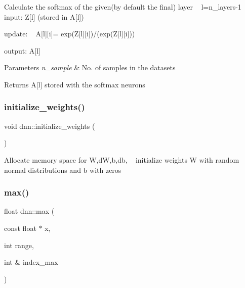 Calculate the softmax of the given(by default the final) layer ~\newline
 l=n\+\_\+layers-\/1 ~\newline
 input\+: Z\mbox{[}l\mbox{]} (stored in A\mbox{[}l\mbox{]}) ~\newline


update\+: ~\newline
 A\mbox{[}l\mbox{]}\mbox{[}i\mbox{]}= exp(\+Z\mbox{[}l\mbox{]}\mbox{[}i\mbox{]})/(exp(\+Z\mbox{[}l\mbox{]}\mbox{[}i\mbox{]})) ~\newline


output\+: A\mbox{[}l\mbox{]} ~\newline
 
\begin{DoxyParams}{Parameters}
{\em n\+\_\+sample} & No. of samples in the datasets \\
\hline
\end{DoxyParams}
\begin{DoxyReturn}{Returns}
A\mbox{[}l\mbox{]} stored with the softmax neurons 
\end{DoxyReturn}
\mbox{\label{classdnn_aea2749931a0cb4bd48112371852633a9}} 
\subsubsection{\texorpdfstring{initialize\+\_\+weights()}{initialize\_weights()}}
{\footnotesize\ttfamily void dnn\+::initialize\+\_\+weights (\begin{DoxyParamCaption}{ }\end{DoxyParamCaption})}

Allocate memory space for W,dW,b,db, ~\newline
 initialize weights W with random ~\newline
 normal distributions and b with zeros ~\newline
 \mbox{\label{classdnn_acb3008f68cd011e0820612c972fae41d}} 
\subsubsection{\texorpdfstring{max()}{max()}}
{\footnotesize\ttfamily float dnn\+::max (\begin{DoxyParamCaption}\item[{const float $\ast$}]{x,  }\item[{int}]{range,  }\item[{int \&}]{index\+\_\+max }\end{DoxyParamCaption})}


